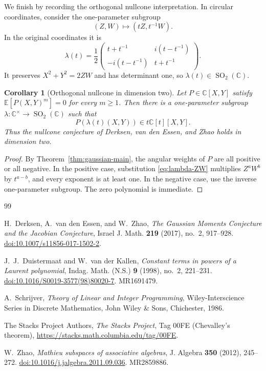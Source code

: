 \documentclass[11pt]{article}
\numberwithin{equation}{section}
\newtheorem{corollary}[theorem]{Corollary}
\theoremstyle{definition}
\theoremstyle{remark}
\newcommand{\C}{\mathbb C}
\newcommand{\E}{\mathbb E}
\newcommand{\SO}{\operatorname{SO}}
\begin{document}
We finish by recording the orthogonal nullcone interpretation.  In circular
coordinates, consider the one-parameter subgroup
\begin{equation}\label{eq:lambda-ZW}
  (Z,W)\longmapsto(tZ,t^{-1}W).
\end{equation}
In the original coordinates it is
\begin{equation}\label{eq:lambda-XY}
  \lambda(t)=\frac12
  \begin{pmatrix}
    t+t^{-1} & i(t-t^{-1})\\
    -i(t-t^{-1}) & t+t^{-1}
  \end{pmatrix}.
\end{equation}
It preserves $X^2+Y^2=2ZW$ and has determinant one, so
$\lambda(t)\in\SO_2(\C)$.

\begin{corollary}[Orthogonal nullcone in dimension two]
Let $P\in\C[X,Y]$ satisfy
$\E[P(X,Y)^m]=0$ for every $m\ge1$.  Then there is a one-parameter subgroup
$\lambda:\C^\times\to\SO_2(\C)$ such that
\[
  P(\lambda(t)(X,Y))\in t\C[t][X,Y].
\]
Thus the nullcone conjecture of Derksen, van den Essen, and Zhao holds in
dimension two.
\end{corollary}

\begin{proof}
By Theorem~\ref{thm:gaussian-main}, the angular weights of $P$ are all
positive or all negative.  In the positive case, substitution
\eqref{eq:lambda-ZW} multiplies $Z^aW^b$ by $t^{a-b}$, and every exponent is
at least one.  In the negative case, use the inverse one-parameter subgroup.
The zero polynomial is immediate.
\end{proof}

\begin{thebibliography}{99}

H.~Derksen, A.~van den Essen, and W.~Zhao,
\emph{The Gaussian Moments Conjecture and the Jacobian Conjecture},
Israel J. Math. \textbf{219} (2017), no.~2, 917--928.
\href{https://doi.org/10.1007/s11856-017-1502-2}{doi:10.1007/s11856-017-1502-2}.

J.~J.~Duistermaat and W.~van der Kallen,
\emph{Constant terms in powers of a Laurent polynomial},
Indag. Math. (N.S.) \textbf{9} (1998), no.~2, 221--231.
\href{https://doi.org/10.1016/S0019-3577(98)80020-7}{doi:10.1016/S0019-3577(98)80020-7}.
MR1691479.

A.~Schrijver,
\emph{Theory of Linear and Integer Programming},
Wiley-Interscience Series in Discrete Mathematics,
John Wiley \& Sons, Chichester, 1986.

The Stacks Project Authors,
\emph{The Stacks Project},
Tag 00FE (Chevalley's theorem),
\url{https://stacks.math.columbia.edu/tag/00FE}.

W.~Zhao,
\emph{Mathieu subspaces of associative algebras},
J. Algebra \textbf{350} (2012), 245--272.
\href{https://doi.org/10.1016/j.jalgebra.2011.09.036}{doi:10.1016/j.jalgebra.2011.09.036}.
MR2859886.

\end{thebibliography}
\end{document}
